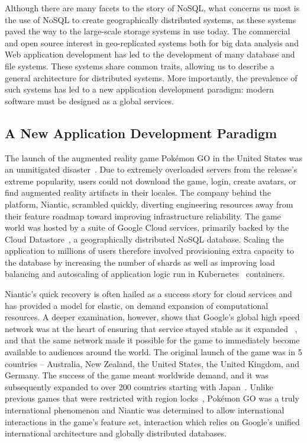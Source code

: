 Although there are many facets to the story of NoSQL, what concerns us most is the use of NoSQL to create geographically distributed systems, as these systems paved the way to the large-scale storage systems in use today.
The commercial and open source interest in geo-replicated systems both for big data analysis and Web application development has led to the development of many database and file systems.
These systems share common traits, allowing us to describe a general architecture for distributed systems.
More importantly, the prevalence of such systems has led to a new application development paradigm: modern software must be designed as a global services.

\subsection{A New Application Development Paradigm}
\label{ch02_new_software_paradigm}

The launch of the augmented reality game Pokémon GO in the United States was an unmitigated disaster~\cite{kain_pokemon_2016}.
Due to extremely overloaded servers from the release's extreme popularity, users could not download the game, login, create avatars, or find augmented reality artifacts in their locales.
The company behind the platform, Niantic, scrambled quickly, diverting engineering resources away from their feature roadmap toward improving infrastructure reliability.
The game world was hosted by a suite of Google Cloud services, primarily backed by the Cloud Datastore~\cite{cloud_datastore}, a geographically distributed NoSQL database.
Scaling the application to millions of users therefore involved provisioning extra capacity to the database by increasing the number of shards as well as improving load balancing and autoscaling of application logic run in Kubernetes~\cite{Kubernetes} containers.

Niantic's quick recovery is often hailed as a success story for cloud services and has provided a model for elastic, on demand expansion of computational resources.
A deeper examination, however, shows that Google's global high speed network was at the heart of ensuring that service stayed stable as it expanded ~\cite{stone_bringing_2016}, and that the same network made it possible for the game to immediately become available to audiences around the world.
The original launch of the game was in 5 countries -- Australia, New Zealand, the United States, the United Kingdom, and Germany.
The success of the game meant worldwide demand, and it was subsequently expanded to over 200 countries starting with Japan~\cite{yamazaki_developer_2016}.
Unlike previous games that were restricted with region locks~\cite{region_locking}, Pokémon GO was a truly international phenomenon and Niantic was determined to allow international interactions in the game's feature set, interaction which relies on Google's unified international architecture and globally distributed databases.

